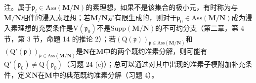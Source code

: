 注。属于\(\mathfrak{p}_i\in\mathrm{Ass}(\mathbf{M}/\mathbf{N})\)的素理想，如果不是该集合的极小元，有时称为与\(\mathbf{M}/\mathbf{N}\)相伴的浸入素理想；若\(\mathbf{M}/\mathbf{N}\)是有限生成的，则对于\(\mathfrak{p}_0\in\mathrm{Ass}(\mathbf{M}/\mathbf{N})\)成为浸入素理想的充要条件是\(\mathrm{V}(\mathfrak{p}_0)\)不是\(\mathrm{Supp}(\mathbf{M}/\mathbf{N})\)的不可约分支（第二章，第 4 节，第 3 节，命题 14 的推论 2）；若\((\mathrm{Q}(\mathfrak{p}))_{\mathfrak{p}\in\mathrm{Ass}(\mathbf{M}/\mathbf{N})}\)和\((\mathrm{Q}'(\mathfrak{p}))_{\mathfrak{p}\in\mathrm{Ass}(\mathbf{M}/\mathbf{N})}\)是\(\mathbf{N}\)在\(\mathbf{M}\)中的两个既约准素分解，则可能有\(\mathrm{Q}'(\mathfrak{p}_0)\neq\mathrm{Q}(\mathfrak{p}_0)\)（习题 24 (c)）；总可以通过对其中出现的准素子模附加补充条件，定义\(\mathbf{N}\)在\(\mathbf{M}\)中的典范既约准素分解（习题 4）。

